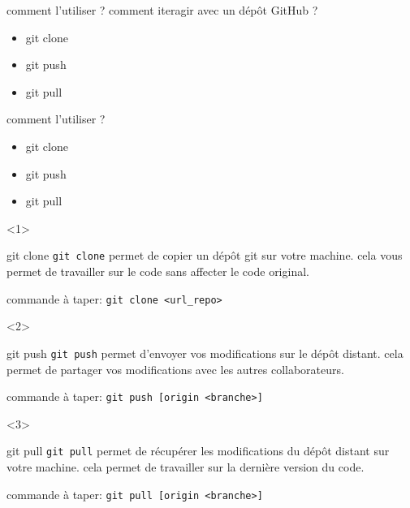 \documentclass[usenames,dvipsnames]{beamer}
\begin{document}
\begin{frame}[fragile]{comment l'utiliser ?}
	comment iteragir avec un dépôt GitHub ?
	\begin{itemize}
		\item git clone
		\item git push
		\item git pull
	\end{itemize}
\end{frame}

\begin{frame}[fragile]{comment l'utiliser ?}
	\begin{itemize}
		\item<1-3> git clone
		\item <2-3> git push
		\item <3-3> git pull
	\end{itemize}

	\begin{onlyenv}
		\begin{block}{git clone}
			\texttt{git clone} permet de copier un dépôt git sur votre machine. cela vous permet de travailler sur le code sans affecter le code original.
		\end{block}

		commande à taper: \lstinline|git clone <url_repo>|
	\end{onlyenv}

	\begin{onlyenv}
		\begin{block}{git push}
			\texttt{git push} permet d'envoyer vos modifications sur le dépôt distant. cela permet de partager vos modifications avec les autres collaborateurs.
		\end{block}

		commande à taper: \lstinline|git push [origin <branche>]|
	\end{onlyenv}

	\begin{onlyenv}
		\begin{block}{git pull}
			\texttt{git pull} permet de récupérer les modifications du dépôt distant sur votre machine. cela permet de travailler sur la dernière version du code.
		\end{block}

		commande à taper: \lstinline|git pull [origin <branche>]|
	\end{onlyenv}
\end{frame}
\end{document}
